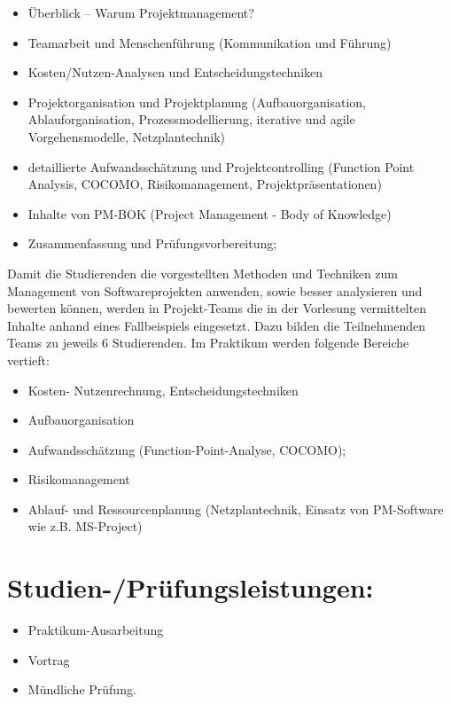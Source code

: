 \begin{itemize}
\tightlist
\item
  Überblick -- Warum Projektmanagement?
\item
  Teamarbeit und Menschenführung (Kommunikation und Führung)
\item
  Kosten/Nutzen-Analysen und Entscheidungstechniken
\item
  Projektorganisation und Projektplanung (Aufbauorganisation,
  Ablauforganisation, Prozessmodellierung, iterative und agile
  Vorgehensmodelle, Netzplantechnik)
\item
  detaillierte Aufwandsschätzung und Projektcontrolling (Function Point
  Analysis, COCOMO, Risikomanagement, Projektpräsentationen)
\item
  Inhalte von PM-BOK (Project Management - Body of Knowledge)
\item
  Zusammenfassung und Prüfungsvorbereitung;
\end{itemize}

Damit die Studierenden die vorgestellten Methoden und Techniken zum
Management von Softwareprojekten anwenden, sowie besser analysieren und
bewerten können, werden in Projekt-Teams die in der Vorlesung
vermittelten Inhalte anhand eines Fallbeispiels eingesetzt. Dazu bilden
die Teilnehmenden Teams zu jeweils 6 Studierenden. Im Praktikum werden
folgende Bereiche vertieft:

\begin{itemize}
\tightlist
\item
  Kosten- Nutzenrechnung, Entscheidungstechniken
\item
  Aufbauorganisation
\item
  Aufwandsschätzung (Function-Point-Analyse, COCOMO);
\item
  Risikomanagement
\item
  Ablauf- und Ressourcenplanung (Netzplantechnik, Einsatz von
  PM-Software wie z.B. MS-Project)
\end{itemize}

\section*{Studien-/Prüfungsleistungen:}\label{studien-pruxfcfungsleistungen-18}

\begin{itemize}
\tightlist
\item
  Praktikum-Ausarbeitung
\item
  Vortrag
\item
  Mündliche Prüfung.
\end{itemize}

